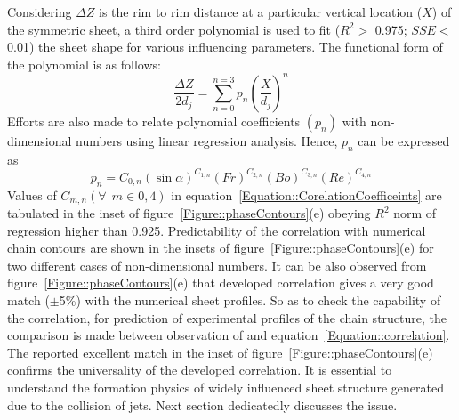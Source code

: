 \documentclass{jfm}
\begin{document}
Considering $\Delta Z$ is the rim to rim distance at a particular vertical location ($X$) of the symmetric sheet, a third order polynomial is used to fit ($R^2 >$ 0.975; $SSE <$ 0.01) the sheet shape for various influencing parameters. The functional form of the polynomial is as follows: 
\begin{equation}\label{Equation::correlation}
\frac{\Delta Z}{2d_j} = \sum_{n = 0}^{n = 3}p_n\left(\frac{X}{d_j}\right)^n
\end{equation}
Efforts are also made to relate polynomial coefficients $\left(p_n\right)$ with non-dimensional numbers using linear regression analysis. Hence, $p_n$ can be expressed as
\begin{equation}\label{Equation::CorelationCoefficeints}
p_n = C_{0,n}\left(\sin\alpha\right)^{C_{1,n}}\left(Fr\right)^{C_{2,n}}\left(Bo\right)^{C_{3,n}}\left(Re\right)^{C_{4,n}}
\end{equation}
Values of $C_{m,n} \left(\forall\:\: m \in {0,4}\right)$ in equation~\ref{Equation::CorelationCoefficeints} are tabulated in the inset of figure~\ref{Figure::phaseContours}(e) obeying $R^2$ norm of regression higher than 0.925. Predictability of the correlation with numerical chain contours are shown in the insets of figure~\ref{Figure::phaseContours}(e) for two different cases of non-dimensional numbers. It can be also observed from figure~\ref{Figure::phaseContours}(e) that developed correlation gives a very good match ($\pm$5\%) with the numerical sheet profiles. So as to check the capability of the correlation, for prediction of experimental profiles of the chain structure, the comparison is made between observation of \cite{bush2004collision} and equation~\ref{Equation::correlation}. The reported excellent match in the inset of figure~\ref{Figure::phaseContours}(e) confirms the universality of the developed correlation. It is essential to understand the formation physics of widely influenced sheet structure generated due to the collision of jets. Next section dedicatedly discusses the issue.
\end{document}

